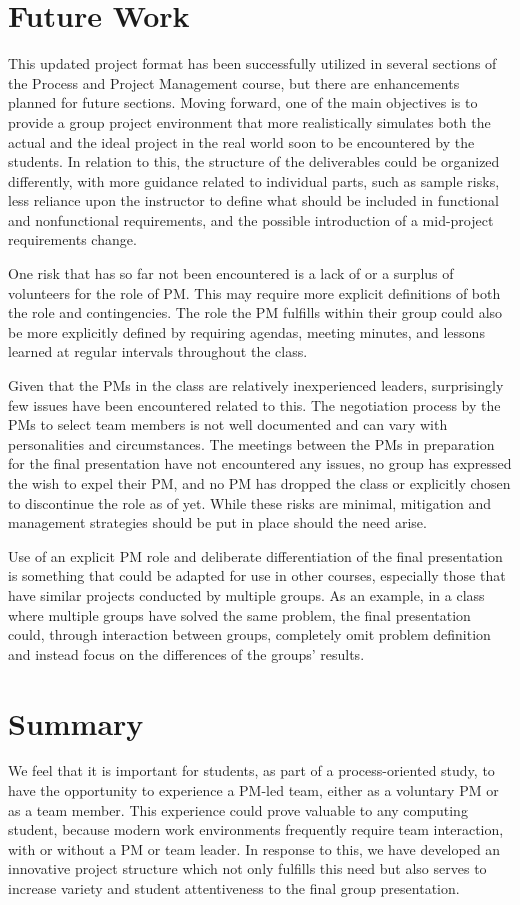 \documentclass{sig-alternate}
\begin{document}
\section{Future Work}
\label{sec:future}
This updated project format has been successfully utilized in several sections of the Process and
Project Management course, but there are enhancements planned for future sections. Moving forward,
one of the main objectives is to provide a group project environment that more realistically simulates both
the actual and the ideal project in the real world soon to be encountered by the students. In relation to
this, the structure of the deliverables could be organized differently, with more guidance related to
individual parts, such as sample risks, less reliance upon the instructor to define what should be included
in functional and nonfunctional requirements, and the possible introduction of a mid-project requirements
change.

One risk that has so far not been encountered is a lack of or a surplus of volunteers for the role of PM.
This may require more explicit definitions of both the role and contingencies. The role the PM fulfills
within their group could also be more explicitly defined by requiring agendas, meeting minutes, and
lessons learned at regular intervals throughout the class.

Given that the PMs in the class are relatively inexperienced leaders, surprisingly few issues have been
encountered related to this. The negotiation process by the PMs to select team members is not well
documented and can vary with personalities and circumstances. The meetings between the PMs in
preparation for the final presentation have not encountered any issues, no group has expressed the wish to
expel their PM, and no PM has dropped the class or explicitly chosen to discontinue the role as of yet.
While these risks are minimal, mitigation and management strategies should be put in place should the
need arise.

Use of an explicit PM role and deliberate differentiation of the final presentation is something that
could be adapted for use in other courses, especially those that have similar projects conducted by
multiple groups.  As an example, in a class where multiple groups have solved the same problem, the
final presentation could, through interaction between groups, completely omit problem definition
and instead focus on the differences of the groups' results.


\section{Summary}
\label{sec:summary}
We feel that it is important for students, as part of a process-oriented study, to have the opportunity to
experience a PM-led team, either as a voluntary PM or as a team member. This experience could prove valuable 
to any computing student, because modern work environments frequently require team interaction, with or 
without a PM or team leader. In response to this, we have
developed an innovative project structure which not only fulfills this need but also serves to increase
variety and student attentiveness to the final group presentation.
\end{document}
